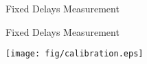 \documentclass[compress,red]{beamer}
\begin{document}
\logo{}
\begin{frame}{Fixed Delays Measurement}


\end{frame}
\begin{frame}{Fixed Delays Measurement}

  \begin{center}
  \texttt{[image: fig/calibration.eps]}
  \end{center}

\end{frame}
% 
% 
% 
\end{document}
